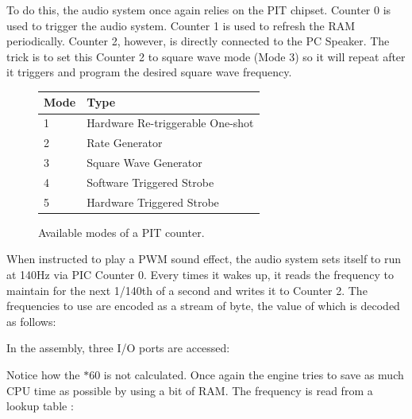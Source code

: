 To do this, the audio system once again relies on the PIT chipset. Counter 0 is used to trigger the audio system. Counter 1 is used to refresh the RAM periodically. Counter 2, however, is directly connected to the PC Speaker. The trick is to set this Counter 2 to square wave mode (Mode 3) so it will repeat after it triggers and program the desired square wave frequency. \\
\par
\begin{figure}[H]
\centering
\begin{tabularx}{\textwidth}{ X X  }
  \toprule
  \textbf{Mode} & \textbf{Type} \\ \bottomrule
1 & Hardware Re-triggerable One-shot\\
2 & Rate Generator\\
3 & Square Wave Generator\\
4 & Software Triggered Strobe\\
5 & Hardware Triggered Strobe\\
\bottomrule
\end{tabularx}
\caption{Available modes of a PIT counter.}
\end{figure}
\par 
When instructed to play a PWM sound effect, the audio system sets itself to run at 140Hz via PIC Counter 0. Every times it wakes up, it reads the frequency to maintain for the next 1/140th of a second and writes it to Counter 2. The frequencies to use are encoded as a stream of byte, the value of which is decoded as follows:\\
\par 
\begin{minipage}{\textwidth}

\end{minipage}
\par
In the assembly, three I/O ports are accessed:\\
\par
\begin{minipage}{\textwidth}

\end{minipage}
\par
Notice how the $ * 60$ is not calculated. Once again the engine tries to save as much CPU time as possible by using a bit of RAM. The frequency is read from a lookup table :\\
\par
\begin{minipage}{\textwidth}

\end{minipage}
